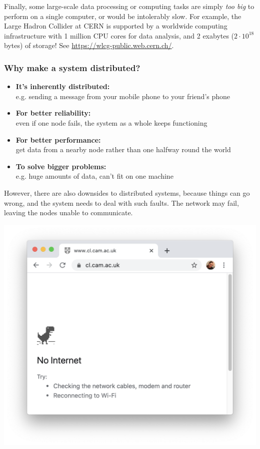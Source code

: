 Finally, some large-scale data processing or computing tasks are simply \emph{too big} to perform on a single computer, or would be intolerably slow.
For example, the Large Hadron Collider at CERN is supported by a worldwide computing infrastructure with 1 million CPU cores for data analysis, and 2 exabytes ($2 \cdot 10^{18}$ bytes) of storage! See \url{https://wlcg-public.web.cern.ch/}.

\begin{frame}
    \label{s:why-distribute}
    \frametitle{Why make a system distributed?}
    \begin{itemize}\pause
        \item \textbf{It's inherently distributed:}\\e.g. sending a message from your mobile phone to your friend's phone\pause
        \item \textbf{For better reliability:}\\even if one node fails, the system as a whole keeps functioning\pause
        \item \textbf{For better performance:}\\get data from a nearby node rather than one halfway round the world\pause
        \item \textbf{To solve bigger problems:}\\e.g. huge amounts of data, can't fit on one machine
    \end{itemize}
\end{frame}
\label{l:why-distribute}

However, there are also downsides to distributed systems, because things can go wrong, and the system needs to deal with such faults.
The network may fail, leaving the nodes unable to communicate.

\begin{frame}
    \label{s:no-internet}
    \includegraphics[height=\paperheight]{images/no-internet.png}
\end{frame}


